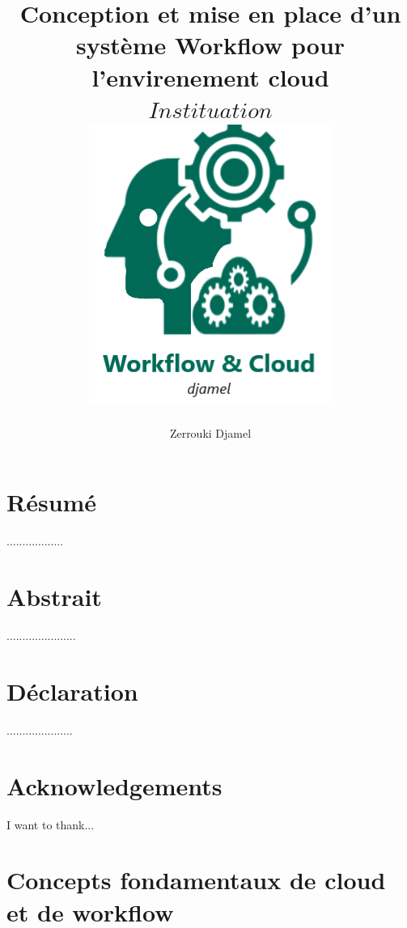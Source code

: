 \documentclass[12pt,twoside]{report}
\title{
	{\textbf{Conception et mise en place d’un système Workflow  pour l’envirenement cloud}} \\   
	{$ Instituation $}\\
	{\includegraphics{logof.PNG}}
}
\author{Zerrouki Djamel}
\begin{document}
\maketitle
 
\chapter*{Résumé}
..................

\chapter*{Abstrait}
......................

\chapter*{Déclaration}
.....................

\chapter*{Acknowledgements}
I want to thank...
\listoffigures

\listoftables

\tableofcontents


\chapter{Concepts fondamentaux de cloud et de workflow }


%

%
 

 \printbibliography
\end{document}
